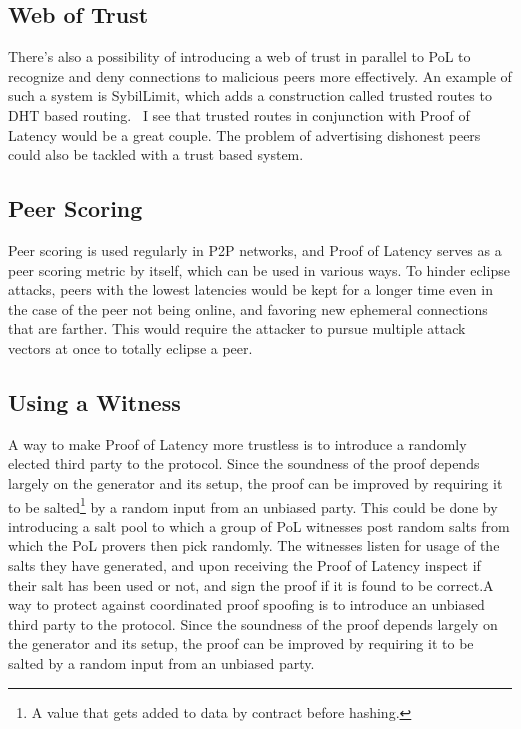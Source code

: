 \subsection{Web of Trust}
There's also a possibility of introducing a web of trust in parallel to PoL to recognize and deny connections to malicious peers more effectively. An example of such a system is SybilLimit, which adds a construction called trusted routes to DHT based routing.~\cite{Yu2008-xl} I see that trusted routes in conjunction with Proof of Latency would be a great couple. The problem of advertising dishonest peers could also be tackled with a trust based system.

\subsection{Peer Scoring}
Peer scoring is used regularly in P2P networks, and Proof of Latency serves as a peer scoring metric by itself, which can be used in various ways. To hinder eclipse attacks, peers with the lowest latencies would be kept for a longer time even in the case of the peer not being online, and favoring new ephemeral connections that are farther. This would require the attacker to pursue multiple attack vectors at once to totally eclipse a peer.

\subsection{Using a Witness}
A way to make Proof of Latency more trustless is to introduce a randomly elected third party to the protocol. Since the soundness of the proof depends largely on the generator and its setup, the proof can be improved by requiring it to be salted\footnote{A value that gets added to data by contract before hashing.} by a random input from an unbiased party. This could be done by introducing a salt pool to which a group of PoL witnesses post random salts from which the PoL provers then pick randomly. The witnesses listen for usage of the salts they have generated, and upon receiving the Proof of Latency inspect if their salt has been used or not, and sign the proof if it is found to be correct.A way to protect against coordinated proof spoofing is to introduce an unbiased third party to the protocol. Since the soundness of the proof depends largely on the generator and its setup, the proof can be improved by requiring it to be salted by a random input from an unbiased party.


